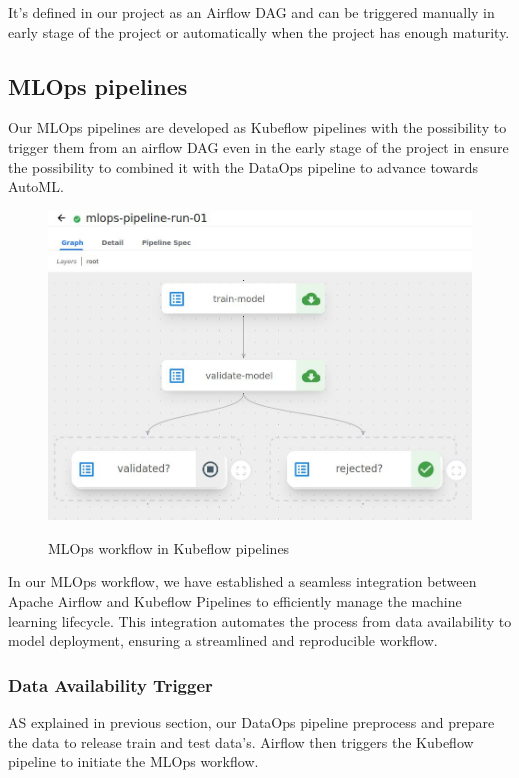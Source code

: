 It's defined in our project as an Airflow DAG and can be triggered manually in early stage of the project or
automatically when the project has enough maturity.

\subsection{MLOps pipelines}\label{subsec:mlops-pipelines}
Our MLOps pipelines are developed as Kubeflow pipelines with the possibility to trigger them from an airflow DAG
even in the early stage of the project in ensure the possibility to combined it with the DataOps pipeline to advance towards AutoML.

\begin{figure}[!htbp]
    \centering
    \caption{MLOps workflow in Kubeflow pipelines}
    \includegraphics[scale=0.3]{images/project/mlops-workflow-kubeflow}
    \label{fig:mlops-workflow-kubeflow}
\end{figure}

In our MLOps workflow, we have established a seamless integration between Apache Airflow and Kubeflow Pipelines to
efficiently manage the machine learning lifecycle.
This integration automates the process from data availability to model deployment, ensuring a streamlined and reproducible workflow.

\subsubsection{Data Availability Trigger}
AS explained in previous section, our DataOps pipeline preprocess and prepare the data to release train and test data's.
Airflow then triggers the Kubeflow pipeline to initiate the MLOps workflow.

